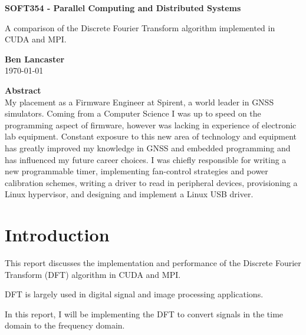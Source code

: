 \documentclass[11pt,a4paper]{article}
\begin{document}
\begin{titlepage}
\begin{center}

\vspace*{3cm}
\Large
\textbf{SOFT354 - Parallel Computing and Distributed Systems}

\vspace{0.4cm}
\large
A comparison of the Discrete Fourier Transform algorithm implemented in CUDA and MPI.

\vspace{4cm}
\textbf{Ben Lancaster}\\
\today

\vspace{4cm}
\textbf{Abstract}\\
\small
My placement as a Firmware Engineer at Spirent, a world leader in GNSS simulators. Coming from a Computer Science I was up to speed on the programming aspect of firmware, however was lacking in experience of electronic lab equipment. Constant exposure to this new area of technology and equipment has greatly improved my knowledge in GNSS and embedded programming and has influenced my future career choices. I was chiefly responsible for writing a new programmable timer, implementing fan-control strategies and power calibration schemes, writing a driver to read in peripheral devices, provisioning a Linux hypervisor, and designing and implement a Linux USB driver.

\end{center}

\end{titlepage}

\renewcommand*\contentsname{Table of Contents}
\tableofcontents
\newpage

\section{Introduction}
This report discusses the implementation and performance of the Discrete Fourier Transform (DFT) algorithm in CUDA and MPI.

DFT is largely used in digital signal and image processing applications. 

In this report, I will be implementing the DFT to convert signals in the time domain to the frequency domain.
\end{document}
